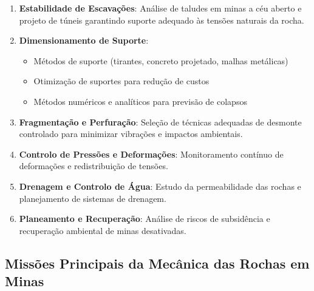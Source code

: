 \documentclass[12pt,a4paper,twoside]{book}
\begin{document}
\begin{enumerate}
    \item \textbf{Estabilidade de Escavações}: Análise de taludes em minas a céu aberto e projeto 
    de túneis garantindo suporte adequado às tensões naturais da rocha.
    
    \item \textbf{Dimensionamento de Suporte}: 
    \begin{itemize}
        \item Métodos de suporte (tirantes, concreto projetado, malhas metálicas)
        \item Otimização de suportes para redução de custos
        \item Métodos numéricos e analíticos para previsão de colapsos
    \end{itemize}
    
    \item \textbf{Fragmentação e Perfuração}: Seleção de técnicas adequadas de desmonte controlado 
    para minimizar vibrações e impactos ambientais.
    
    \item \textbf{Controlo de Pressões e Deformações}: Monitoramento contínuo de deformações e 
    redistribuição de tensões.
    
    \item \textbf{Drenagem e Controlo de Água}: Estudo da permeabilidade das rochas e planejamento 
    de sistemas de drenagem.
    
    \item \textbf{Planeamento e Recuperação}: Análise de riscos de subsidência e recuperação ambiental 
    de minas desativadas.
\end{enumerate}

\subsection{Missões Principais da Mecânica das Rochas em Minas}
\end{document}
